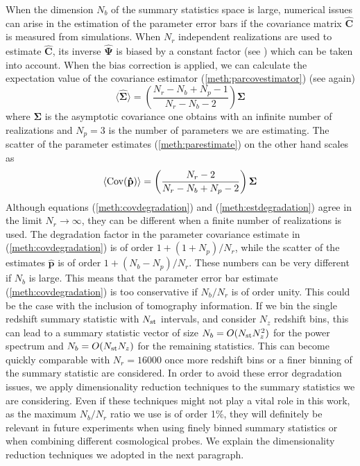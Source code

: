 \documentclass[reprint,aps,prd,superscriptaddress,showkeys,showpacs]{revtex4-1}
\newcommand{\bb}[1]{\mathbf{#1}}
\newcommand{\bbh}[1]{\mathbf{\hat{#1}}}
\begin{document}
When the dimension $N_b$ of the summary statistics space is large, numerical issues can arise in the estimation of the parameter error bars if the covariance matrix $\bbh{C}$ is measured from simulations. When $N_r$ independent realizations are used to estimate $\bbh{C}$, its inverse $\bbh{\Psi}$ is biased by a constant factor (see \citep{Hartlap07,Taylor12,Taylor14}) which can be taken into account. When the bias correction is applied, we can calculate the expectation value of the covariance estimator (\ref{meth:parcovestimator}) (see again\citep{Taylor14})
\begin{equation}
\label{meth:covdegradation}
\langle\bbh{\Sigma}\rangle = \left(\frac{N_r-N_b+N_p-1}{N_r-N_b-2}\right)\bb{\Sigma}
\end{equation}   
%
where $\bb{\Sigma}$ is the asymptotic covariance one obtains with an infinite number of realizations and $N_p=3$ is the number of parameters we are estimating. The scatter of the parameter estimates (\ref{meth:parestimate}) on the other hand scales as \citep{Taylor14}
\begin{equation}
\label{meth:estdegradation}
\langle{\rm Cov}(\bbh{p})\rangle = \left(\frac{N_r-2}{N_r-N_b+N_p-2}\right)\bb{\Sigma}
\end{equation}
%
Although equations (\ref{meth:covdegradation}) and (\ref{meth:estdegradation}) agree in the limit $N_r\rightarrow\infty$, they can be different when a finite number of realizations is used. The degradation factor in the parameter covariance estimate in (\ref{meth:covdegradation}) is of order $1+(1+N_p)/N_r$, while the scatter of the estimates $\bbh{p}$ is of order $1+(N_b-N_p)/N_r$. These numbers can be very different if $N_b$ is large. This means that the parameter error bar estimate (\ref{meth:covdegradation}) is too conservative if $N_b/N_r$ is of order unity. This could be the case with the inclusion of tomography information. If we bin the single redshift summary statistic with $N_{\rm st}$ intervals, and consider $N_z$ redshift bins, this can lead to a summary statistic vector of size $N_b = O(N_{\rm st}N_z^2)$ for the power spectrum and $N_b = O(N_{\rm st}N_z)$ for the remaining statistics. This can become quickly comparable with $N_r=16000$ once more redshift bins or a finer binning of the summary statistic are considered. In order to avoid these error degradation issues, we apply dimensionality reduction techniques to the summary statistics we are considering. Even if these techniques might not play a vital role in this work, as the maximum $N_b/N_r$ ratio we use is of order 1\%, they will definitely be relevant in future experiments when using finely binned summary statistics or when combining different cosmological probes. We explain the dimensionality reduction techniques we adopted in the next paragraph.   
\end{document}
